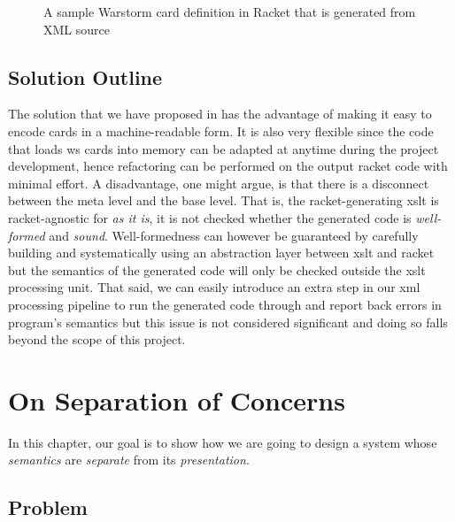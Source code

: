 \documentclass[10pt,oneside,a4paper]{skh-scrreprt}
\begin{document}
\begin{figure}[h]\label{fig:sample-card-in-racket}
\caption[Warstorm Card Definition in Racket Generated from XML]{%
  A sample Warstorm card definition in Racket that is generated from XML
  source}

\end{figure}

\section{Solution Outline}

The solution that we have proposed in 
has the advantage of making it
easy to encode cards in a
machine-readable form.
It is also very flexible since
the code that loads \gls{ws} cards into
memory can be adapted at anytime
during the project development,
hence refactoring can be
performed on the output \gls{racket}
code with minimal effort.
A disadvantage, one might argue,
is that there is a disconnect
between the meta level and the
base level. That is, the
\gls{racket}-generating \gls{xslt} is
\gls{racket}-agnostic for \emph{as it is},
it is not checked whether
the generated code is 
\emph{well-formed} and \emph{sound}.
Well-formedness can however
be guaranteed by carefully
building and systematically using
an abstraction layer
between \gls{xslt} and \gls{racket}
but the semantics of the generated
code will only be checked outside
the \gls{xslt} processing unit.
That said, we can easily introduce
an extra step in our
\gls{xml} processing pipeline
to run the generated code through
 and report
back errors in program's semantics
but this issue is not considered
significant and doing so falls beyond the
scope of this project.

\chapter{On Separation of Concerns}\label{chap:soc}


In this chapter, our goal 
is to show how we are going to
design a system whose
\emph{semantics} are \emph{separate}
from its \emph{presentation}.

\section{Problem}\label{sec:soc-problem}
\end{document}
